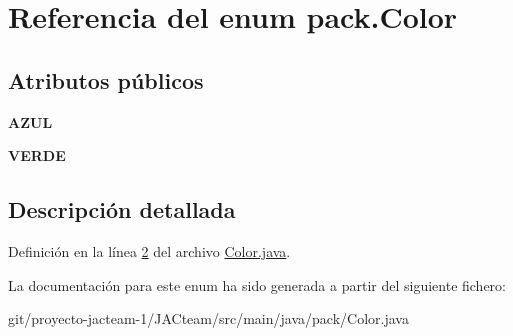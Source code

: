 \hypertarget{enumpack_1_1_color}{}\section{Referencia del enum pack.\+Color}
\label{enumpack_1_1_color}
\subsection*{Atributos públicos}
\begin{DoxyCompactItemize}
\item 
\mbox{\label{enumpack_1_1_color_ac1e42c7e63f3585d09d53f4b9597f54c}} 
{\bfseries A\+Z\+UL}
\item 
\mbox{\label{enumpack_1_1_color_ad1ae59752dce20918ee5a92ea3f83c5f}} 
{\bfseries V\+E\+R\+DE}
\end{DoxyCompactItemize}


\subsection{Descripción detallada}


Definición en la línea \mbox{\hyperlink{_color_8java_source_l00002}{2}} del archivo \mbox{\hyperlink{_color_8java_source}{Color.\+java}}.



La documentación para este enum ha sido generada a partir del siguiente fichero\+:\begin{DoxyCompactItemize}
\item 
git/proyecto-\/jacteam-\/1/\+J\+A\+Cteam/src/main/java/pack/Color.\+java\end{DoxyCompactItemize}
